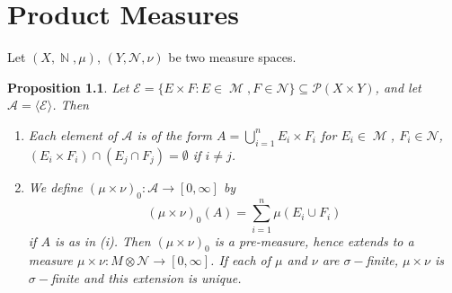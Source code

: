 \documentclass[12pt, a4paper]{memoir}
\DeclareMathOperator{\N}{{\mathbb{N}}}
\newtheorem{proposition}[theorem]{Proposition}
\theoremstyle{nonumberplain}
\DeclareMathOperator{\M}{\mathcal{M}}
\begin{document}
\chapter{Product Measures}
Let $(X,\N,\mu)$, $(Y,\mathcal{N},\nu)$ be two measure spaces.
\begin{proposition}
    Let $\mathcal{E}=\{E\times F:E\in\M,F\in\mathcal{N}\}\subseteq\mathcal{P}(X\times Y)$, and let $\mathcal{A}=\langle\mathcal{E}\rangle$.
    Then
    \begin{enumerate}[nolistsep]
        \item Each element of $\mathcal{A}$ is of the form $A=\bigcup_{i=1}^n E_i\times F_i$ for $E_i\in\M$, $F_i\in\mathcal{N}$, $(E_i\times F_i)\cap (E_j\cap F_j)=\emptyset$ if $i\neq j$.
        \item We define $(\mu\times\nu)_0:\mathcal{A}\to[0,\infty]$ by
            \begin{equation*}
                (\mu\times\nu)_0(A)=\sum_{i=1}^n\mu(E_i\cup F_i)
            \end{equation*}
            if $A$ is as in (i).
            Then $(\mu\times\nu)_0$ is a pre-measure, hence extends to a measure $\mu\times\nu:M\otimes\mathcal{N}\to[0,\infty]$.
            If each of $\mu$ and $\nu$ are $\sigma-$finite, $\mu\times\nu$ is $\sigma-$finite and this extension is unique.
    \end{enumerate}
\end{proposition}
\end{document}
